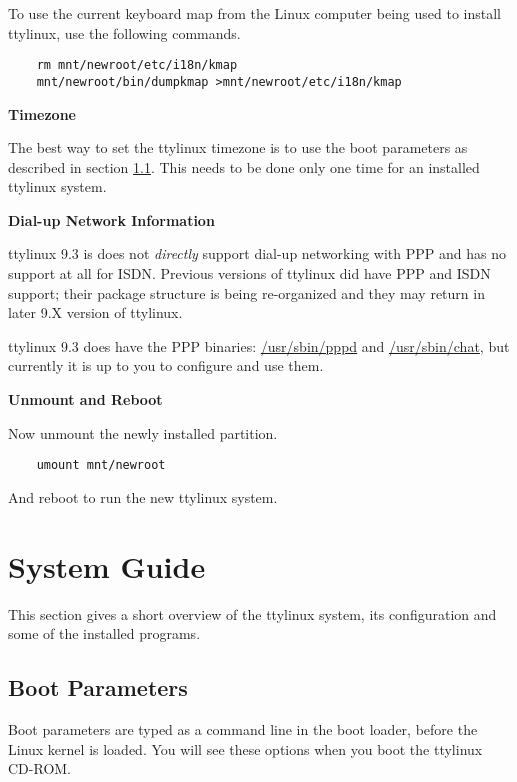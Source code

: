 \documentclass[10pt]{article}
\begin{document}
To use the current keyboard map from the Linux computer being used to install
ttylinux, use the following commands.

\begin{lstlisting}
	rm mnt/newroot/etc/i18n/kmap
	mnt/newroot/bin/dumpkmap >mnt/newroot/etc/i18n/kmap
\end{lstlisting}

{\bf Timezone}

The best way to set the ttylinux timezone is to use the boot parameters as
described in section \ref{bootparms}. This needs to be done only one time for
an installed ttylinux system.

{\bf Dial-up Network Information}

ttylinux 9.3 is does not {\it directly} support dial-up networking with PPP and
has no support at all for ISDN. Previous versions of ttylinux did have PPP and
ISDN support; their package structure is being re-organized and they may return
in later 9.X version of ttylinux.

ttylinux 9.3 does have the PPP binaries: \url{/usr/sbin/pppd} and
\url{/usr/sbin/chat}, but currently it is up to you to configure and use them.

{\bf Unmount and Reboot}

Now unmount the newly installed partition.

\begin{lstlisting}
	umount mnt/newroot
\end{lstlisting}

And reboot to run the new ttylinux system.

\newpage
\section{System Guide}
\label{sysguide}

This section gives a short overview of the ttylinux system, its configuration
and some of the installed programs.

\subsection{Boot Parameters}
\label{bootparms}

Boot parameters are typed as a command line in the boot loader, before the
Linux kernel is loaded. You will see these options when you boot the ttylinux
CD-ROM.
\end{document}
